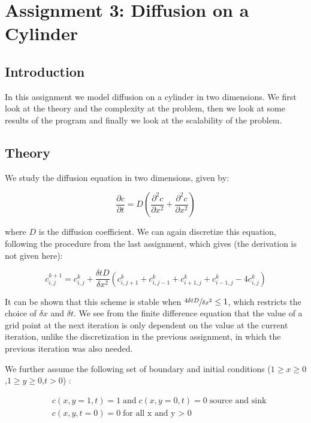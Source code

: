 \documentclass[11pt,a4paper,onecolumn]{article}
\begin{document}
\newpage

\section{Assignment 3: Diffusion on a Cylinder}
\subsection{Introduction}
In this assignment we model diffusion on a cylinder in two dimensions. We first look at the theory and the complexity at the problem, then we look at some results of the program and finally we look at the scalability of the problem.

\subsection{Theory}
We study the diffusion equation in two dimensions, given by:

\begin{equation}
  \frac{\partial c}{\partial t} = D (\frac{\partial^2 c}{\partial x^2} + \frac{\partial^2 c}{\partial x^2})
\end{equation}

where $D$ is the diffusion coefficient. We can again discretize this equation, following the procedure from the last assignment, which gives (the derivation is not given here):

\begin{equation}
  \label{eq:diff}
  c_{i,j}^{k+1} = c_{i,j}^k + \frac{\delta t D}{\delta x^2}(c_{i,j+1}^k + c_{i,j-1}^k + c_{i+1,j}^k + c_{i-1,j}^k - 4 c_{i,j}^k)
\end{equation}

It can be shown that this scheme is stable when $\sfrac{4 \delta t D}{\delta x^2} \leq 1$, which restricts the choice of $\delta x$ and $\delta t$. We see from the finite difference equation that the value of a grid point at the next iteration is only dependent on the value at the current iteration, unlike the discretization in the previous assignment, in which the previous iteration was also needed.

We further assume the following set of boundary and initial conditions ($1 \geq x \geq 0$,$1 \geq y \geq 0$,$t > 0$) :

\begin{align}
  &c(x,y=1,t) = 1 \; \text{and} \; c(x,y=0,t) = 0 \; \text{source and sink} \nonumber \\
  &c(x,y,t=0) = 0 \; \text{for all x and y > 0}
\end{align}
\end{document}
